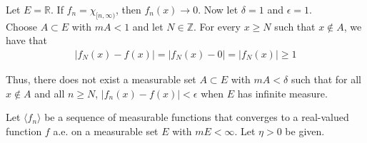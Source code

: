 \documentclass[12pt]{article}
\newenvironment{problem}[2][Problem]{\begin{trivlist}
\item[\hskip \labelsep {\bfseries #1}\hskip \labelsep {\bfseries #2.}]}{\end{trivlist}}
\begin{document}
Let $E = \mathbb{R}$. If $f_n = \chi_{[n, \infty)}$, then $f_n(x) \to 0$. Now let $\delta = 1$ and $\epsilon = 1$.\\

Choose $A \subset E$ with $mA < 1$ and let $N \in \mathbb{Z}$. For every $x \geq N$ such that $x \not\in A$, we have that 
\begin{align*}
|f_N(x) - f(x)| = |f_N(x) - 0| = |f_N(x)| \geq 1
\end{align*}

Thus, there does not exist a measurable set $A \subset E$ with $mA < \delta$ such that for all $x \not\in A$ and all $n \geq N$, $|f_n(x) - f(x)| < \epsilon$ when $E$ has infinite measure.

\begin{problem}{4}
\end{problem}

Let $\langle f_n \rangle$ be a sequence of measurable functions that converges to a real-valued function $f$ a.e. on a measurable set $E$ with $mE < \infty$. Let $\eta > 0$ be given.
\end{document}
